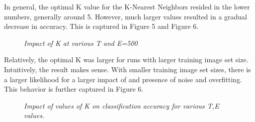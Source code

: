\documentclass{article} %
\begin{document}
In general, the optimal K value for the K-Nearest Neighbors resided in the lower numbers, generally around 5. However, much larger values resulted in a gradual decrease in accuracy. This is captured in Figure 5 and Figure 6.

\begin{figure}[h]%
	\centering
    	\hfill%
    \caption{\textit{Impact of K at various T and E=500}}
    \label{fig:default}
\end{figure}

Relatively, the optimal K was larger for runs with larger training image set size. Intuitively, the result makes sense. With smaller training image set sizes, there is a larger likelihood for a larger impact of and presence of noise and overfitting. This behavior is further captured in Figure 6.

\begin{figure}[h]%
	\centering
    	\hfill%
        \hfill%
    \caption{\textit{Impact of values of K on classification accuracy for various T,E values.}}
    \label{fig:default}
\end{figure}
\end{document}
